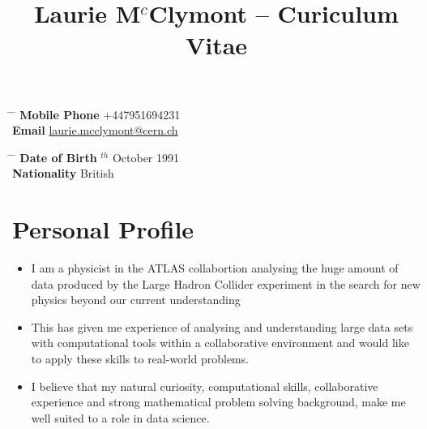 \documentclass[10pt]{article} %
\begin{document}

\title{Laurie M$^{c}$Clymont -- Curiculum Vitae} %
\vspace{-5mm}


\parbox{0.4\textwidth}{ %
\begin{tabbing} %
\hspace{3cm} \= \hspace{3cm} \= \kill %
{\bf Mobile Phone} \> +447951694231 \\ %
{\bf Email} \> \href{mailto:laurie.mcclymont@cern.ch}{laurie.mcclymont@cern.ch} \\ %
\end{tabbing}}
\hfill %
\parbox{0.4\textwidth}{ %
\begin{tabbing} %
\hspace{3cm} \= \hspace{4cm} \= \kill %
{\bf Date of Birth} $^{th}$ October 1991 \\ %
{\bf Nationality} \> British \\ %
\end{tabbing}}


\vspace{-9mm}
\section{Personal Profile}
\begin{itemize}
\item{I am a physicist in the ATLAS collabortion analysing the huge amount of data produced by the Large Hadron Collider experiment in the search for new physics beyond our current understanding}
\item{This has given me experience of analysing and understanding large data sets with computational tools within
  a collaborative environment and would like to apply these skills to real-world problems.}
\item{I believe that my natural curiosity, computational skills, collaborative experience and strong mathematical problem solving background, make me well suited to a role in data science.}
\end{itemize}
\end{document}
